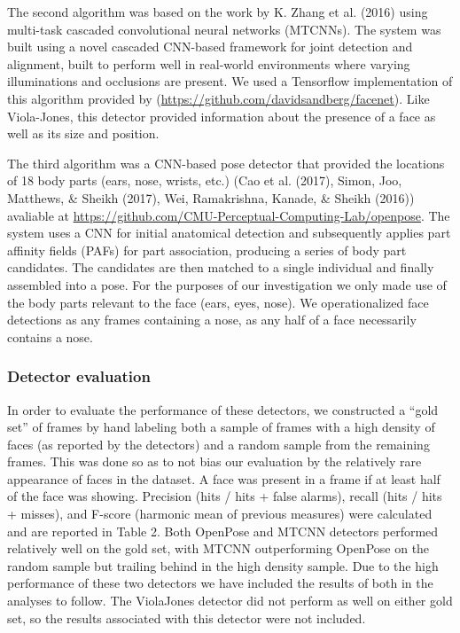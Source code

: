 \documentclass[10pt, letterpaper]{article}
\begin{document}
The second algorithm was based on the work by K. Zhang et al. (2016)
using multi-task cascaded convolutional neural networks (MTCNNs). The
system was built using a novel cascaded CNN-based framework for joint
detection and alignment, built to perform well in real-world
environments where varying illuminations and occlusions are present. We
used a Tensorflow implementation of this algorithm provided by
(\url{https://github.com/davidsandberg/facenet}). Like Viola-Jones, this
detector provided information about the presence of a face as well as
its size and position.

The third algorithm was a CNN-based pose detector that provided the
locations of 18 body parts (ears, nose, wrists, etc.) (Cao et al.
(2017), Simon, Joo, Matthews, \& Sheikh (2017), Wei, Ramakrishna,
Kanade, \& Sheikh (2016)) avaliable at
\url{https://github.com/CMU-Perceptual-Computing-Lab/openpose}. The
system uses a CNN for initial anatomical detection and subsequently
applies part affinity fields (PAFs) for part association, producing a
series of body part candidates. The candidates are then matched to a
single individual and finally assembled into a pose. For the purposes of
our investigation we only made use of the body parts relevant to the
face (ears, eyes, nose). We operationalized face detections as any
frames containing a nose, as any half of a face necessarily contains a
nose.\\

\subsubsection{Detector evaluation}\label{detector-evaluation}

In order to evaluate the performance of these detectors, we constructed
a ``gold set'' of frames by hand labeling both a sample of frames with a
high density of faces (as reported by the detectors) and a random sample
from the remaining frames. This was done so as to not bias our
evaluation by the relatively rare appearance of faces in the dataset. A
face was present in a frame if at least half of the face was showing.
Precision (hits / hits + false alarms), recall (hits / hits + misses),
and F-score (harmonic mean of previous measures) were calculated and are
reported in Table 2. Both OpenPose and MTCNN detectors performed
relatively well on the gold set, with MTCNN outperforming OpenPose on
the random sample but trailing behind in the high density sample. Due to
the high performance of these two detectors we have included the results
of both in the analyses to follow. The ViolaJones detector did not
perform as well on either gold set, so the results associated with this
detector were not included.
\end{document}
